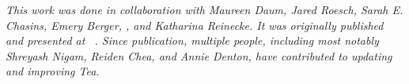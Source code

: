 \begin{comment}
4-5 sentences: 
1. Restate problem 
2. Articulate core contributions: problem/idea + technical
3. Key Evaluation results
4. 1 soundbite/takeaway
5. Transition to next chapter. 

1. Restate problem 

A common approach to assessing support for conceptual hypotheses in data is to
use statistical tests (e.g., Student's t-test, Chi-Square test, ANOVA).
Statistical testing requires analysts to grapple with their conceptual
hypotheses, know a number of tests and when they are applicable (i.e., know the
preconditions for when these tests hold), assess the applicability of tests
(i.e., check preconditions), and pick and implement specific tests using
low-level APIs. 

2. Articulate core contributions: problem/idea + technical

Tea's key insight is that we can reformulate statistical test selection as a
constraint satisfaction problem. We designed and implemented a higher-level DSL
around this insight that takes an analyst's hypothesis and assumptions about
their data as input and provides the results of executing valid statistical
tests as output. 

3. Key Evaluation results

In an evaluation, we found that Tea avoids faulty test
selection and conclusions that are easy to make using existing tools.

4. 1 soundbite/takeaway 

It is possible to design higher level language and automated reasoning to select
valid statistical tests that are widely used and even avoid faulty conclusions
that are easy to make using existing tools. The key is to make implicit
assumptions about the data explicit and reason about analyst assumptions and
computed data properties together in a logical constraint system. 

5. Transition to next chapter. 

However, an important limitation to overcome in the future chapters, most
notably in Tisane (~\autoref{chapter:tisane}) is how to generalize automated
support for more complex research questions and statistical analyses. 

Tea demonstrates the feasibility and benefit of developing systems that
emphasize \textit{higher-level abstractions} and \textit{automated reasoning}
for statistical tests (\autoref{para:thesisStatement}). Next, we consider how
this approach generalizes to a larger class of statistical analyses. could
\end{comment}

\textit{This work was done in collaboration with Maureen Daum, Jared Roesch, Sarah E.
Chasins, Emery Berger, \reneJust, and Katharina Reinecke. It was originally
published and presented at ~\cite{jun2019tea}. Since publication, multiple
people, including most notably Shreyash Nigam, Reiden Chea, and Annie Denton,
have contributed to updating and improving Tea.}
